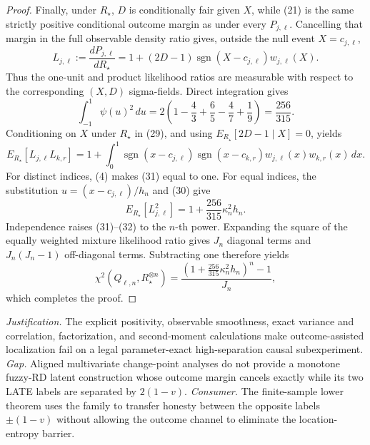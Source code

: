 \documentclass{article}
\begin{document}
\begin{proof}
Finally, under \(R_\star\), \(D\) is conditionally fair given \(X\), while (21) is the same strictly positive conditional outcome margin as under every \(P_{j,\ell}\).  Cancelling that margin in the full observable density ratio gives, outside the null event \(X=c_{j,\ell}\),
\[
L_{j,\ell}:=\frac{dP_{j,\ell}}{dR_\star}
=1+(2D-1)\operatorname{sgn}(X-c_{j,\ell})w_{j,\ell}(X).
\tag{29}
\]
Thus the one-unit and product likelihood ratios are measurable with respect to the corresponding \((X,D)\) sigma-fields.  Direct integration gives
\[
\int_{-1}^{1}\psi(u)^2\,du
=2\left(1-\frac43+\frac65-\frac47+\frac19\right)
=\frac{256}{315}.
\tag{30}
\]
Conditioning on \(X\) under \(R_\star\) in (29), and using \(E_{R_\star}[2D-1\mid X]=0\), yields
\[
E_{R_\star}[L_{j,\ell}L_{k,r}]
=1+\int_0^1
\operatorname{sgn}(x-c_{j,\ell})
\operatorname{sgn}(x-c_{k,r})
w_{j,\ell}(x)w_{k,r}(x)\,dx.
\tag{31}
\]
For distinct indices, (4) makes (31) equal to one.  For equal indices, the substitution \(u=(x-c_{j,\ell})/h_n\) and (30) give
\[
E_{R_\star}[L_{j,\ell}^2]
=1+\frac{256}{315}\kappa_n^2h_n.
\tag{32}
\]
Independence raises (31)--(32) to the \(n\)-th power.  Expanding the square of the equally weighted mixture likelihood ratio gives \(J_n\) diagonal terms and \(J_n(J_n-1)\) off-diagonal terms.  Subtracting one therefore yields
\[
\chi^2(Q_{\ell,n},R_\star^{\otimes n})
=\frac{\left(1+\frac{256}{315}\kappa_n^2h_n\right)^n-1}{J_n},
\]
which completes the proof.
\end{proof}
\par\smallskip\noindent \textit{Justification.} The explicit positivity, observable smoothness, exact variance and correlation, factorization, and second-moment calculations make outcome-assisted localization fail on a legal parameter-exact high-separation causal subexperiment. \textit{Gap.} Aligned multivariate change-point analyses do not provide a monotone fuzzy-RD latent construction whose outcome margin cancels exactly while its two LATE labels are separated by \(2(1-v)\). \textit{Consumer.} The finite-sample lower theorem uses the family to transfer honesty between the opposite labels \(\pm(1-v)\) without allowing the outcome channel to eliminate the location-entropy barrier.
\end{document}
